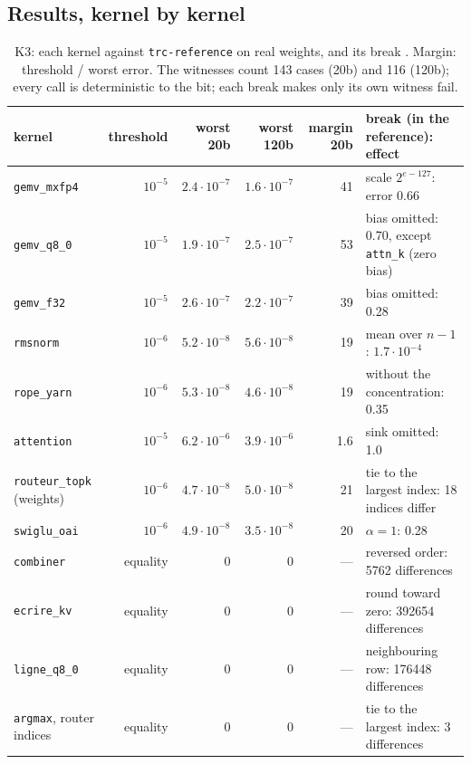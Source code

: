 \subsection{Results, kernel by kernel}

\begin{table}[!htbp]
\centering\small
\caption[K3: the twelve kernels against the f64 reference]{K3: each kernel against \texttt{trc-reference} on real weights, and its break \mes. Margin: threshold / worst error. The witnesses count 143 cases (20b) and 116 (120b); every call is deterministic to the bit; each break makes only its own witness fail.}
\label{tab:t2n-k3}
\footnotesize
\begin{tabularx}{\linewidth}{@{}lrrrrX@{}}
\toprule
kernel & threshold & worst 20b & worst 120b & margin 20b & break (in the reference): effect \\
\midrule
\texttt{gemv\_mxfp4} & $10^{-5}$ & $2.4\cdot10^{-7}$ & $1.6\cdot10^{-7}$ & 41 & scale $2^{e-127}$: error 0.66 \\
\texttt{gemv\_q8\_0} & $10^{-5}$ & $1.9\cdot10^{-7}$ & $2.5\cdot10^{-7}$ & 53 & bias omitted: 0.70, except \texttt{attn\_k} (zero bias) \\
\texttt{gemv\_f32} & $10^{-5}$ & $2.6\cdot10^{-7}$ & $2.2\cdot10^{-7}$ & 39 & bias omitted: 0.28 \\
\texttt{rmsnorm} & $10^{-6}$ & $5.2\cdot10^{-8}$ & $5.6\cdot10^{-8}$ & 19 & mean over $n - 1$: $1.7\cdot10^{-4}$ \\
\texttt{rope\_yarn} & $10^{-6}$ & $5.3\cdot10^{-8}$ & $4.6\cdot10^{-8}$ & 19 & without the concentration: 0.35 \\
\texttt{attention} & $10^{-5}$ & $6.2\cdot10^{-6}$ & $3.9\cdot10^{-6}$ & 1.6 & sink omitted: 1.0 \\
\texttt{routeur\_topk} (weights) & $10^{-6}$ & $4.7\cdot10^{-8}$ & $5.0\cdot10^{-8}$ & 21 & tie to the largest index: 18 indices differ \\
\texttt{swiglu\_oai} & $10^{-6}$ & $4.9\cdot10^{-8}$ & $3.5\cdot10^{-8}$ & 20 & $\alpha = 1$: 0.28 \\
\texttt{combiner} & equality & 0 & 0 & — & reversed order: \num{5762} differences \\
\texttt{ecrire\_kv} & equality & 0 & 0 & — & round toward zero: \num{392654} differences \\
\texttt{ligne\_q8\_0} & equality & 0 & 0 & — & neighbouring row: \num{176448} differences \\
\texttt{argmax}, router indices & equality & 0 & 0 & — & tie to the largest index: 3 differences \\
\bottomrule
\end{tabularx}
\end{table}

